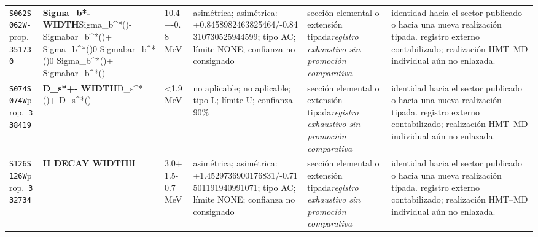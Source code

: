 \begin{landscape}
\begin{longtable}{L{1.85cm}L{4.45cm}L{2.35cm}L{4.05cm}L{3.35cm}L{7.15cm}}
\texttt{S062}\newline \texttt{S062W-}\newline prop.\ \texttt{351730} & \textbf{Sigma\_\allowbreak{}b*- WIDTH}\newline Sigma\_\allowbreak{}b\textasciicircum{}*()- \textbar{}\allowbreak{} Sigmabar\_\allowbreak{}b\textasciicircum{}*()+ \textbar{}\allowbreak{} Sigma\_\allowbreak{}b\textasciicircum{}*()0 \textbar{}\allowbreak{} Sigmabar\_\allowbreak{}b\textasciicircum{}*()0 \textbar{}\allowbreak{} Sigma\_\allowbreak{}b\textasciicircum{}*()+ \textbar{}\allowbreak{} Sigmabar\_\allowbreak{}b\textasciicircum{}*()- & 10.4+-0.8\,MeV & asimétrica; asimétrica: +0.8458982463825464/-0.84310730525944599; tipo AC; límite NONE; confianza no consignado & sección elemental o extensión tipada\newline \emph{registro exhaustivo sin promoción comparativa} & identidad hacia el sector publicado o hacia una nueva realización tipada. registro externo contabilizado; realización HMT--MD individual aún no enlazada. \\
\texttt{S074}\newline \texttt{S074W}\newline prop.\ \texttt{338419} & \textbf{D\_\allowbreak{}s*+- WIDTH}\newline D\_\allowbreak{}s\textasciicircum{}*()+ \textbar{}\allowbreak{} D\_\allowbreak{}s\textasciicircum{}*()- & \textless{}1.9\,MeV & no aplicable; no aplicable; tipo L; límite U; confianza 90\% & sección elemental o extensión tipada\newline \emph{registro exhaustivo sin promoción comparativa} & identidad hacia el sector publicado o hacia una nueva realización tipada. registro externo contabilizado; realización HMT--MD individual aún no enlazada. \\
\texttt{S126}\newline \texttt{S126W}\newline prop.\ \texttt{332734} & \textbf{H DECAY WIDTH}\newline H & 3.0+1.5-0.7\,MeV & asimétrica; asimétrica: +1.4529736900176831/-0.71501191940991071; tipo AC; límite NONE; confianza no consignado & sección elemental o extensión tipada\newline \emph{registro exhaustivo sin promoción comparativa} & identidad hacia el sector publicado o hacia una nueva realización tipada. registro externo contabilizado; realización HMT--MD individual aún no enlazada. \\
\end{longtable}
\endgroup
\end{landscape}
